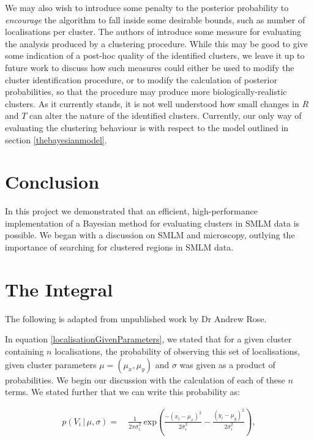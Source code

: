 \documentclass[11pt]{article}
\newcommand{\sig}{\overline{\sigma}_i}
\newcommand{\eq}{=&\ }
\begin{document}
We may also wish to introduce some penalty to the posterior probability to \textit{encourage} the algorithm to fall inside some desirable bounds, such as number of localisations per cluster.
The authors of \cite{datta2006methods} introduce some measure for evaluating the analysis produced by a clustering procedure. While this may be good to give some indication of a post-hoc quality of the identified clusters, we leave it up to future work to discuss how such measures could either be used to modify the cluster identification procedure, or to modify the calculation of posterior probabilities, so that the procedure may produce more biologically-realistic clusters.
As it currently stands, it is not well understood how small changes in $R$ and $T$ can alter the nature of the identified clusters. Currently, our only way of evaluating the clustering behaviour is with respect to the model outlined in section \ref{thebayesianmodel}. 

\section*{Conclusion}

In this project we demonstrated that an efficient, high-performance implementation of a Bayesian method for evaluating clusters in SMLM data is possible. We began with a discussion on SMLM and microscopy, outlying the importance of searching for clustered regions in SMLM data. 


\newpage		
\nocite{*}



\appendix

\newpage
\section{The Integral}
\label{appendix:integral}
The following is adapted from unpublished work by Dr Andrew Rose.

In equation \ref{localisationGivenParameters}, we stated that for a given cluster containing $n$ localisations, the probability of observing this set of localisations, given cluster parameters $\mu = (\mu_x, \mu_y)$ and $\sigma$ was given as a product of probabilities. We begin our discussion with the calculation of each of these $n$ terms. We stated further that we can write this probability as:

\begin{align*}
	p(V_{i}\,|\,\mu,\sigma) \eq  \frac{1}{2\pi\sig^2}\ \text{exp}\left( \frac{-(x_{i}-\mu_x)^2 }{ 2\sig^2 }  - \frac{(y_{i}-\mu_y)^2 }{ 2\sig^2 }\right),
\end{align*}
\end{document}
